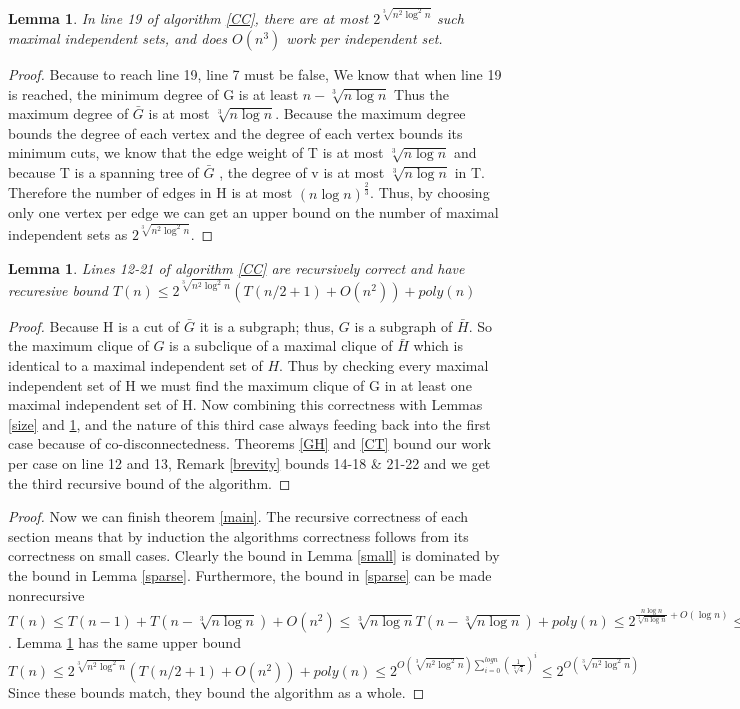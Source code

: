 \documentclass[12pt]{article}
\newtheorem{lem}[thm]{Lemma}
\begin{document}
\begin{lem} \label{count} In line 19 of algorithm \ref{CC}, there are at most $2^{\sqrt[3]{n^2\log^2n}}$ such maximal independent sets, and does $O(n^3)$ work per independent set.\end{lem}
\begin{proof} Because to reach line 19, line 7 must be false, We know that when line 19 is reached, the minimum degree of G is at least $n - \sqrt[3]{n\log n }$ Thus the maximum degree of $\bar{G}$ is at most $\sqrt[3]{n\log n}$. Because the maximum degree bounds the degree of each vertex and the degree of each vertex bounds its minimum cuts, we know that the edge weight of T is at most $\sqrt[3]{n \log n}$ and because T is a spanning tree of $\bar{G}$ , the degree of v is at most $\sqrt[3]{n\log n}$ in T. Therefore the number of edges in H is at most $(n\log n )^{\frac{2}{3}}$. Thus, by choosing only one vertex per edge we can get an upper bound on the number of maximal independent sets as $2^{\sqrt[3]{n^2\log^2n}}$.
\end{proof}
\begin{lem}\label{cut} Lines 12-21 of algorithm \ref{CC} are recursively correct and have recuresive bound $T(n) \le 2^{\sqrt[3]{n^2\log^2 n}}(T(n/2+1)+ O(n^2)) + poly(n)$\end{lem}
\begin{proof} Because H is a cut of $\bar{G}$ it is a subgraph; thus, $G$ is a subgraph of $\bar{H}$. So the maximum clique of $G$ is a subclique of a maximal clique of $\bar{H}$ which is identical to a maximal independent set of $H$. Thus by checking every maximal independent set of H we must find the maximum clique of G in at least one maximal independent set of H. Now combining this correctness with Lemmas \ref{size} and \ref{count}, and the nature of this third case always feeding back into the first case because of co-disconnectedness. Theorems \ref{GH} and \ref{CT} bound our work per case on line 12 and 13, Remark \ref{brevity} bounds 14-18 \& 21-22 and we get the third recursive bound of the algorithm.
\end{proof}
\begin{proof}Now we can finish theorem \ref{main}. The recursive correctness of each section means that by induction the algorithms correctness follows from its correctness on small cases. Clearly the bound in Lemma \ref{small} is dominated by the bound in Lemma \ref{sparse}. Furthermore, the bound in \ref{sparse} can be made nonrecursive $T(n) \le T(n-1) + T(n-\sqrt[3]{n\log n}) + O(n^2) \le \sqrt[3]{n\log n} T(n- \sqrt[3]{n\log n}) + poly(n) \le 2^{\frac{n\log n}{ \sqrt[3]{n\log n}}+ O(\log n) } \le 2^{O(\sqrt[3]{n^2\log^2n})}$. Lemma \ref{cut} has the same upper bound $T(n) \le  2^{\sqrt[3]{n^2\log^2 n}}(T(n/2+1)+ O(n^2)) + poly(n) \le 2^{O(\sqrt[3]{n^2\log^2 n})\sum_{i=0}^{logn} (\frac{1}{\sqrt[3]{4}})^i} \le 2^{O(\sqrt[3]{n^2\log^2 n})}$ Since these bounds match, they bound the algorithm as a whole.
\end{proof}
\end{document}
